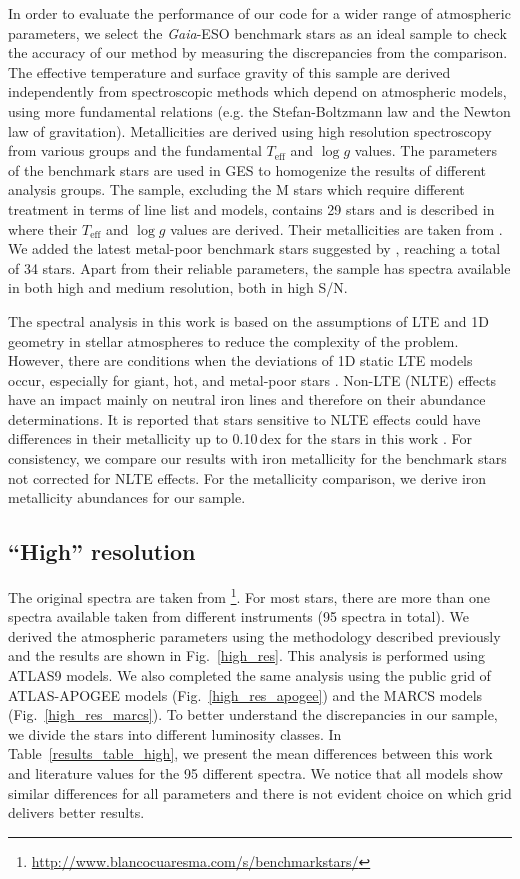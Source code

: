 \documentclass[fleqn,usenatbib]{mnras}
\begin{document}
In order to evaluate the performance of our code for a wider range of atmospheric parameters, we select the \textit{Gaia}-ESO benchmark stars as an ideal sample 
to check the accuracy of our method by measuring the discrepancies from the comparison. The effective temperature and surface gravity of this sample are derived 
independently from spectroscopic methods which depend on atmospheric models, using more fundamental relations (e.g. the Stefan-Boltzmann law and the Newton law of gravitation). 
Metallicities are derived using high resolution spectroscopy from various groups and the fundamental $T_{\mathrm{eff}}$ and $\log g$ values. The parameters of the 
benchmark stars are used in GES to homogenize the results of different analysis groups. The sample, excluding the M stars which require different treatment in 
terms of line list and models, contains 29 stars and is described in \citet{Heiter2015} where their $T_{\mathrm{eff}}$ and $\log g$ values are derived. Their metallicities are taken 
from \citet{jofre2014}. We added the latest metal-poor benchmark stars suggested by \citet{Hawkins2016}, reaching a total of 34 stars. 
Apart from their reliable parameters, the sample has spectra available in both high and medium resolution, both in high S/N. 

The spectral analysis in this work is based on the assumptions of LTE and 1D geometry in stellar atmospheres to reduce the complexity of the problem. 
However, there are conditions when the deviations of 1D static LTE models occur, especially for giant, hot, and metal-poor stars \citep{bergemann2012}. 
Non-LTE (NLTE) effects have an impact mainly on neutral iron lines and therefore on their abundance determinations. 
It is reported that stars sensitive to NLTE effects could have differences in their metallicity up to 0.10\,dex for the stars in this work \citep{jofre2014}. 
For consistency, we compare our results with iron metallicity for the benchmark stars not corrected for NLTE effects. 
For the metallicity comparison, we derive iron metallicity abundances for our sample. 

\subsection{``High'' resolution}\label{high}

The original spectra are taken from \citet{blanco2014b}\footnote{\url{http://www.blancocuaresma.com/s/benchmarkstars/}}. For most stars, there are more than one spectra available taken from 
different instruments (95 spectra in total). We derived the atmospheric parameters using the methodology described previously and the results are shown in Fig.~\ref{high_res}. 
This analysis is performed using ATLAS9 models. We also completed the same analysis using the public grid of ATLAS-APOGEE models (Fig.~\ref{high_res_apogee}) and the MARCS models 
(Fig.~\ref{high_res_marcs}). To better understand the discrepancies in our sample, we divide the stars into different luminosity classes. 
In Table~\ref{results_table_high}, we present the mean differences between this work and literature values for the 95 different spectra. 
We notice that all models show similar differences for all parameters and there is not evident choice on which grid delivers better results.
\end{document}
